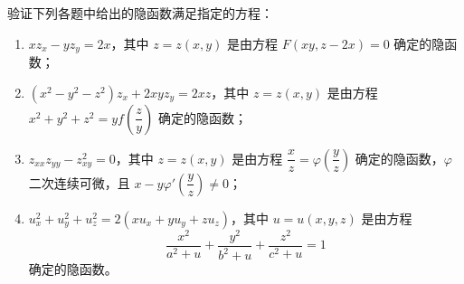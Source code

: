\begin{xexercise}[5]
验证下列各题中给出的隐函数满足指定的方程：
  \begin{enumerate}[label=(\arabic*)]
    \item $xz_x-yz_y=2x$，其中 $z=z(x,y)$ 是由方程 $F(xy,z-2x)=0$ 确定的隐函数；
    \item $(x^2-y^2-z^2)z_x+2xyz_y=2xz$，其中 $z=z(x,y)$ 是由方程 $x^2+y^2+z^2=yf\!\left(\dfrac{z}{y}\right)$ 确定的隐函数；
    \item $z_{xx}z_{yy}-z_{xy}^2=0$，其中 $z=z(x,y)$ 是由方程 $\dfrac{x}{z}=\varphi\!\left(\dfrac{y}{z}\right)$ 确定的隐函数，$\varphi$ 二次连续可微，且 $x-y\varphi'\!\left(\dfrac{y}{z}\right)\ne0$；
    \item $u_x^2+u_y^2+u_z^2=2(xu_x+yu_y+zu_z)$，其中 $u=u(x,y,z)$ 是由方程
    \[
      \frac{x^2}{a^2+u}+\frac{y^2}{b^2+u}+\frac{z^2}{c^2+u}=1
    \]
    确定的隐函数。
  \end{enumerate}
\end{xexercise}
